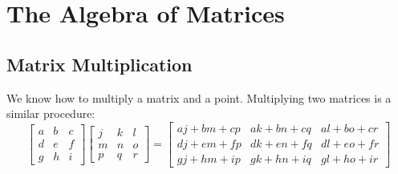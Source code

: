\begin{enumerate}
\end{enumerate}

\newpage








\section{The Algebra of Matrices}


\subsection{Matrix Multiplication}

We know how to multiply a matrix and a point. Multiplying two
matrices is a similar procedure:
\[
\begin{bmatrix}
a & b & c \\ 
d & e & f \\
g & h & i
\end{bmatrix}
\begin{bmatrix}
j & k & l \\ 
m & n & o \\
p & q & r
\end{bmatrix}
= \begin{bmatrix}
aj + bm + cp & ak + bn + cq & al + bo + cr \\
dj + em + fp & dk + en + fq & dl + eo + fr \\
gj + hm + ip & gk + hn + iq & gl + ho + ir 
\end{bmatrix}
\]


